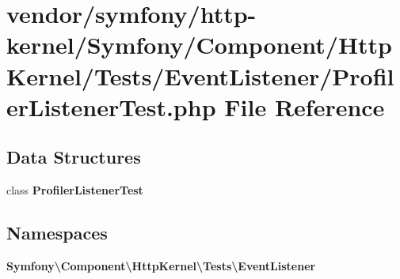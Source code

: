 \section{vendor/symfony/http-\/kernel/\+Symfony/\+Component/\+Http\+Kernel/\+Tests/\+Event\+Listener/\+Profiler\+Listener\+Test.php File Reference}
\label{_profiler_listener_test_8php}
\subsection*{Data Structures}
\begin{DoxyCompactItemize}
\item 
class {\bf Profiler\+Listener\+Test}
\end{DoxyCompactItemize}
\subsection*{Namespaces}
\begin{DoxyCompactItemize}
\item 
 {\bf Symfony\textbackslash{}\+Component\textbackslash{}\+Http\+Kernel\textbackslash{}\+Tests\textbackslash{}\+Event\+Listener}
\end{DoxyCompactItemize}
